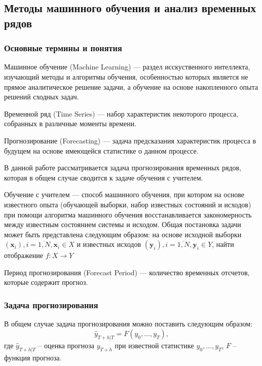 \subsection{Методы машинного обучения и анализ временных рядов}
\subsubsection{Основные термины и понятия}

Машинное обучение (Machine Learning) --- раздел исскуственного интеллекта, изучающий методы и алгоритмы обучения,
особенностью которых является не прямое аналитическое решение задачи, а обучение на основе накопленного опыта решений
сходных задач.

Временной ряд (Time Series) --- набор характеристик некоторого процесса, собранных в различные моменты времени.

Прогнозирование (Forecasting) --- задача предсказания характеристик процесса в будущем на основе имеющейся статистике
о данном процессе.

В данной работе рассматривается задача прогнозирования временных рядов, которая в общем случае сводится к задаче
обучения с учителем.

Обучение с учителем --- способ машинного обучения, при котором на основе известного опыта (обучающей выборки, набор
известных состояний и исходов) при помощи алгоритма машинного обучения восстанавливается закономерность между известным
состоянием системы и исходом. Общая постановка задачи может быть представлена следующим образом: на основе исходной
выборки $\left( \mathbf{x}_i \right), i = \overline{1, N}, \mathbf{x}_i \in X$ и известных исходов
$\left( \mathbf{y}_i \right), i = \overline{1, N}, \mathbf{y}_i \in Y$, найти отображение $f: X \rightarrow Y$

Период прогнозирования (Forecast Period) --- количество временных отсчетов, которые содержит прогноз.

\subsubsection{Задача прогнозирования}
В общем случае задача прогнозирования можно поставить следующим образом:
\begin{equation}
    \hat{y}_{\left.T+h\right|T} = F\left(y_0, \dots, y_T\right),
\end{equation}
где  $\hat{y}_{\left.T+h\right|T}$ -- оценка прогноза $y_{T+h}$ при известной статистике $y_0, \dots, y_T$,
$F$ -- функция прогноза.

